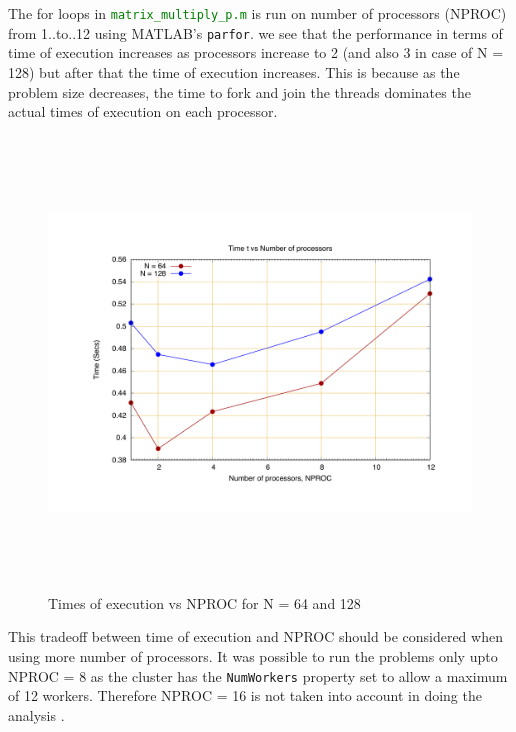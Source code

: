 \documentclass[fleqn,letterpaper,12pt]{report}
\begin{document}
The for loops in {\tt\textcolor{Green}{matrix\_multiply\_p.m}} is run on number of processors (NPROC) from 1..to..12 using MATLAB's {\tt parfor}. we see that the performance in terms of time of execution increases as processors increase to 2 (and also 3 in case of N = 128) but after that the time of execution increases. This is because as the problem size decreases, the time to fork and join the threads dominates the actual times of execution on each processor. 

\begin{figure}[htbp]
	\centering
	\includegraphics[height=120mm,width=160mm]{64n128.pdf}
	\caption{Times of execution vs NPROC for N = 64 and 128\label{overflow}}
\end{figure}

This tradeoff between time of execution and NPROC should be considered when using more number of processors. It was possible to run the problems only upto NPROC = 8 as the cluster has the {\tt{NumWorkers}} property set to allow a maximum of 12 workers. Therefore NPROC = 16 is not taken into account in doing the analysis \cite{PK}.
\end{document}
